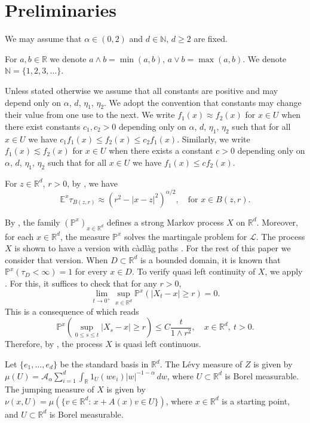\documentclass[a4paper,12pt,reqno]{amsart}
\theoremstyle{definition}
\theoremstyle{remark}
\newcommand{\Aa}{\mathcal{A}_{\alpha}}
\newcommand{\calL}{\mathcal{L}}
\newcommand{\Ee}{\mathds{E}} %
\newcommand{\Pp}{\mathds{P}} %
\newcommand{\R}{\mathds{R}}
\newcommand{\N}{{\mathds{N}}}
\begin{document}
\section{Preliminaries} 
We may assume that $\alpha \in (0,2)$ and $d \in \N$, $d \ge 2$ are fixed.

For $a, b \in \R$ we denote $a \wedge b = \min(a,b)$, $a \vee b = \max(a,b)$. We denote $\N = \{1, 2, 3, \ldots\}$.

Unless stated otherwise we assume that all constants are positive and may depend only on $\alpha$, $d$, $\eta_1$, $\eta_2$. We adopt the convention that constants may change their value from one use to the next. We write $f_1(x) \approx f_2(x)$ for $x \in U$ when there exist constants $c_1, c_2 > 0$ depending only on $\alpha$, $d$, $\eta_1$, $\eta_2$ such that for all $x \in U$ we have $c_1 f_1(x) \le f_2(x) \le c_2 f_1(x)$. Similarly, we write $f_1(x) \lesssim f_2(x)$ for $x \in U$ when there exists a constant $c > 0$ depending only on $\alpha$, $d$, $\eta_1$, $\eta_2$ such that for all $x \in U$ we have $f_1(x) \le c f_2(x)$.

For $z \in \R^d$, $r > 0$, by \cite{R2025}, we have
\begin{equation}
\label{exit_time_ball}
\Ee^x\tau_{B(z,r)} \approx (r^2-|x-z|^2)^{\alpha/2}, \quad \text{for $x \in B(z,r)$}.
\end{equation}

By \cite{BC2006}, the family $(\Pp^x)_{x\in\R^d}$ defines a strong Markov process $X$ on $\R^d$.
Moreover, for each $x\in\R^d$, the measure $\Pp^x$ solves the martingale problem for $\calL$.
The process $X$ is shown to have a version with c\`adl\`ag paths \cite{BC2006}. For the rest of this paper we consider that version. When 
 $D \subset \R^d$ is a bounded domain, it is known that $\Pp^x(\tau_D < \infty) = 1$ for every $x \in D$. 
To verify quasi left continuity of $X$, we apply \cite[Theorem 3.20]{D1965}.
For this, it suffices to check that for any $r>0$,
$$\lim_{t\to 0^+} \sup_{x\in \R^d}\Pp^x\left(|X_{t}-x|\ge r\right) = 0.$$ This is a consequence of \cite[Cor. 4.4]{BC2006} which  reads
$$\Pp^x\left(\sup_{0\le s\le t}|X_{s}-x|\ge r\right)\le C \frac t{1\wedge r^2}, \quad x\in \R^d, \ t>0.$$
Therefore, by \cite[Theorem 3.20]{D1965}, the process $X$ is quasi left continuous. 

Let $\{e_1, \ldots, e_d\}$ be the standard basis in $\R^d$. The L{\'e}vy measure of $Z$ is given by 
$\mu(U) = \Aa \sum_{i = 1}^d \int_{\R} 1_U(w e_i) |w|^{-1-\alpha} \, dw$, where $U \subset \R^d$ is Borel measurable. The jumping measure of $X$ is given by $\nu(x,U) = \mu(\{v \in \R^d: \, x + A(x) v \in U\})$, where $x \in \R^d$ is a starting point, and $U \subset \R^d$ is Borel measurable.
\end{document}
